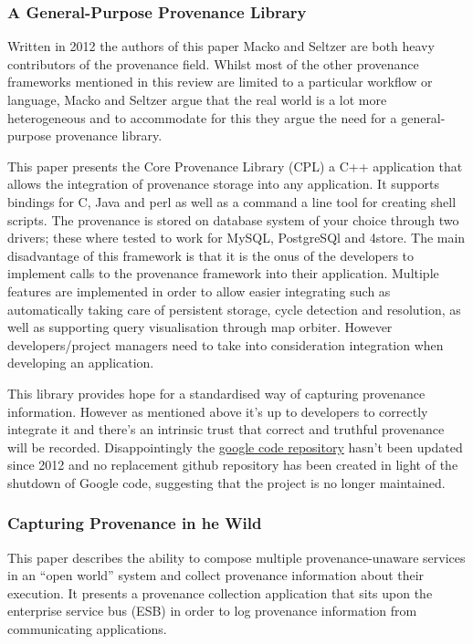 \subsubsection{A General-Purpose Provenance Library\cite{Macko2012}}
\label{sub:a_general_purpose_provenance_library}

Written in 2012 the authors of this paper Macko and Seltzer are both heavy contributors of the provenance field. Whilst most of the other provenance frameworks mentioned in this review are limited to a particular workflow or language, Macko and Seltzer argue that the real world is a lot more heterogeneous and to accommodate for this they argue the need for a general-purpose provenance library.

This paper presents the Core Provenance Library (CPL) a C++ application that allows the integration of provenance storage into any application. It supports bindings for C, Java and perl as well as a command a line tool for creating shell scripts. The provenance is stored on database system of your choice through two drivers; these where tested to work for MySQL, PostgreSQl and 4store. The main disadvantage of this framework is that it is the onus of the developers to implement calls to the provenance framework into their application. Multiple features are implemented in order to allow easier integrating such as automatically taking care of persistent storage, cycle detection and resolution, as well as supporting query visualisation through map orbiter\cite{Seltzer2011}. However developers/project managers need to take into consideration integration when developing an application.

This library provides hope for a standardised way of capturing provenance information. However as mentioned above it's up to developers to correctly integrate it and there's an intrinsic trust that correct and truthful provenance will be recorded. Disappointingly the \href{https://code.google.com/p/core-provenance-library/}{google code repository} hasn't been updated since 2012 and no replacement github repository has been created in light of the shutdown of Google code, suggesting that the project is no longer maintained.

\subsubsection{Capturing Provenance in he Wild\cite{Allen2010}}
\label{sub:capturing_provenance_in_he_wildallen2010}

This paper describes the ability to compose multiple provenance-unaware services in an ``open world'' system and collect provenance information about their execution. It presents a provenance collection application that sits upon the enterprise service bus (ESB) in order to log provenance information from communicating applications.

